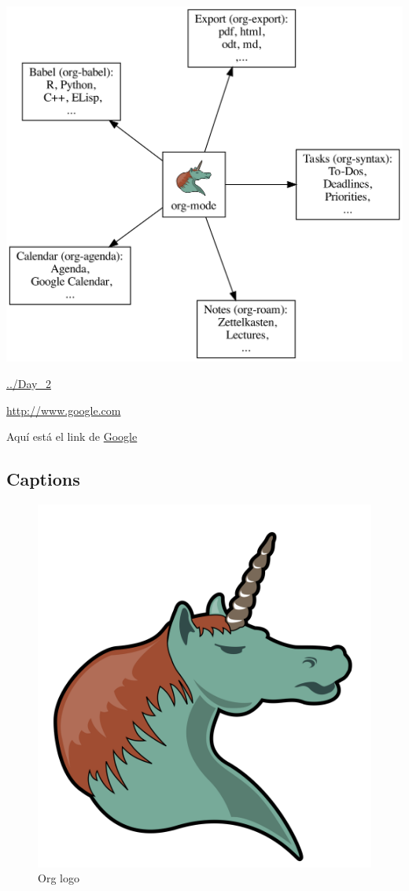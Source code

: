 \documentclass[11pt]{article}
\begin{document}
\begin{center}
\includegraphics[width=.9\linewidth]{org_flow.png}
\end{center}

\url{../Day\_2}

\url{http://www.google.com}

Aquí está el link de \href{http://www.google.com}{Google}


\subsection{Captions}
\label{sec:orgc29eb25}

\begin{figure}[htbp]
\centering
\includegraphics[width=.9\linewidth]{org_logo.png}
\caption{Org logo}
\end{figure}
\end{document}
